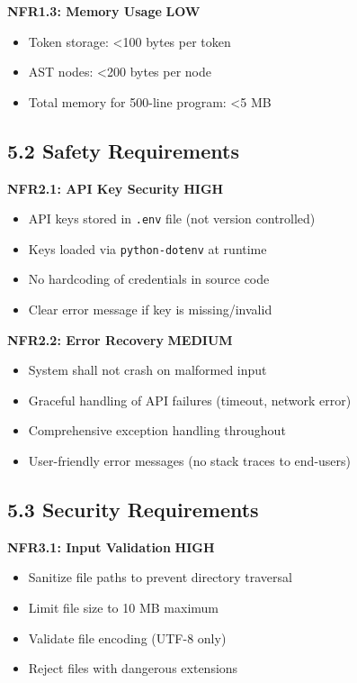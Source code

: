 \documentclass[a4paper,11pt]{article}
\newcommand{\priority}[1]{\colorbox{red!20}{\textbf{#1}}}
\newcommand{\prioritymed}[1]{\colorbox{yellow!20}{\textbf{#1}}}
\newcommand{\prioritylow}[1]{\colorbox{green!20}{\textbf{#1}}}
\begin{document}
\textbf{NFR1.3: Memory Usage} \prioritylow{LOW}

\begin{itemize}
    \item Token storage: <100 bytes per token
    \item AST nodes: <200 bytes per node
    \item Total memory for 500-line program: <5 MB
\end{itemize}

\subsection{5.2 Safety Requirements}

\textbf{NFR2.1: API Key Security} \priority{HIGH}

\begin{itemize}
    \item API keys stored in \texttt{.env} file (not version controlled)
    \item Keys loaded via \texttt{python-dotenv} at runtime
    \item No hardcoding of credentials in source code
    \item Clear error message if key is missing/invalid
\end{itemize}

\textbf{NFR2.2: Error Recovery} \prioritymed{MEDIUM}

\begin{itemize}
    \item System shall not crash on malformed input
    \item Graceful handling of API failures (timeout, network error)
    \item Comprehensive exception handling throughout
    \item User-friendly error messages (no stack traces to end-users)
\end{itemize}

\subsection{5.3 Security Requirements}

\textbf{NFR3.1: Input Validation} \priority{HIGH}

\begin{itemize}
    \item Sanitize file paths to prevent directory traversal
    \item Limit file size to 10 MB maximum
    \item Validate file encoding (UTF-8 only)
    \item Reject files with dangerous extensions
\end{itemize}
\end{document}
